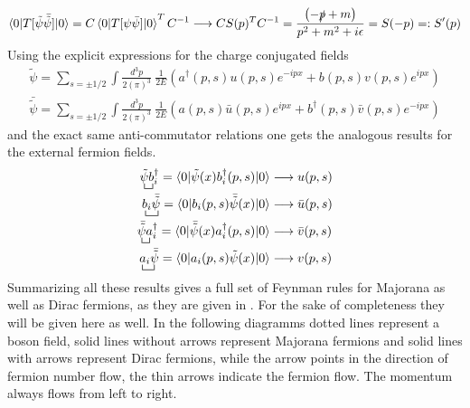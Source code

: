 \begin{equation*}
	\braket{0|T[\tilde{\psi}\bar{\tilde{\psi}}]|0}=C\braket{0|T[\psi\bar{\psi}]|0}^TC^{-1}\longrightarrow CS(p)^TC^{-1}=\frac{\left(-\slashed p+m\right)}{p^2+m^2+i\epsilon}=S(-p)=:S'(p)
\end{equation*}
Using the explicit expressions for the charge conjugated fields
\begin{align*}
\tilde{\psi}=\sum_{s=\pm1/2}\int \frac{d^3p}{2(\pi)^3}\:\frac{1}{2E}\left(a^\dagger(p,s)u(p,s)e^{-ipx}+b(p,s)v(p,s)e^{ipx}\right)\\
\bar{\tilde{\psi}}=\sum_{s=\pm1/2}\int \frac{d^3p}{2(\pi)^3}\:\frac{1}{2E}\left(a(p,s)\bar{u}(p,s)e^{ipx}+b^\dagger(p,s)\bar{v}(p,s)e^{-ipx}\right)
\end{align*}
 and the exact same anti-commutator relations one gets the analogous results for the external fermion fields.
\begin{align*}
\bcontraction{}{\psi}{}{a}\tilde{\psi} b_i^\dagger=\braket{0|\tilde{\psi}(x) b_i^\dagger(p,s)|0}&\longrightarrow u(p,s) \\
\bcontraction{}{a}{{}_i}{\bar{\psi}}b_i\bar{\tilde{\psi}}=\braket{0|b_i(p,s)\bar{\tilde{\psi}}(x)|0}&\longrightarrow \bar{u}(p,s) \\
\bcontraction{}{\bar{\psi}}{}{b}\bar{\tilde{\psi}} a_i^\dagger=\braket{0|\bar{\tilde{\psi}}(x) a_i^\dagger(p,s)|0}&\longrightarrow \bar{v}(p,s)\\
\bcontraction{}{b}{{}_i}{\psi}a_i\bar{\tilde{\psi}}=\braket{0|a_i(p,s)\tilde{\psi}(x)|0}&\longrightarrow v(p,s)
\end{align*}
Summarizing all these results gives a full set of Feynman rules for Majorana as well as Dirac fermions, as they are given in \cite{Denner:1992vza}. For the sake of completeness they will be given here as well. In the following diagramms dotted lines represent a boson field, solid lines without arrows represent Majorana fermions and solid lines with arrows represent Dirac fermions, while the arrow points in the direction of fermion number flow, the thin arrows indicate the fermion flow. The momentum always flows from left to right. 
